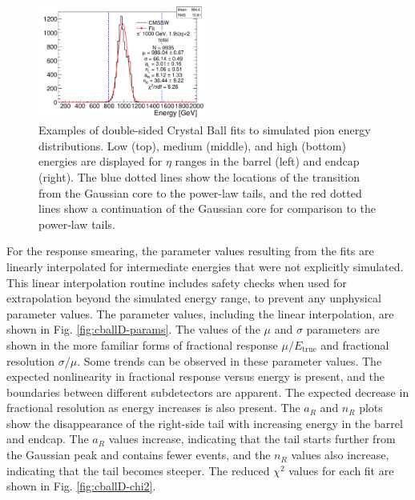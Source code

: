\begin{figure}[hbtp]
\begin{center}
\includegraphics[width=0.49\textwidth]{figures/pion_response_tot_cballD_1000gev_ieta20.pdf}
\caption{Examples of double-sided Crystal Ball fits to simulated pion energy distributions. Low (top), medium (middle), and high (bottom) energies are displayed for $\eta$ ranges in the barrel (left) and endcap (right). The blue dotted lines show the locations of the transition from the Gaussian core to the power-law tails, and the red dotted lines show a continuation of the Gaussian core for comparison to the power-law tails.}
\label{fig:cballD-fits}
\end{center}
\end{figure}

For the response smearing, the parameter values resulting from the fits are linearly interpolated for intermediate energies that were not explicitly simulated. This linear interpolation routine includes safety checks when used for extrapolation beyond the simulated energy range, to prevent any unphysical parameter values. The parameter values, including the linear interpolation, are shown in Fig. \ref{fig:cballD-params}. The values of the $\mu$ and $\sigma$ parameters are shown in the more familiar forms of fractional response $\mu/E_{\text{true}}$ and fractional resolution $\sigma/\mu$. Some trends can be observed in these parameter values. The expected nonlinearity in fractional response versus energy is present, and the boundaries between different subdetectors are apparent. The expected decrease in fractional resolution as energy increases is also present. The $a_{R}$ and $n_{R}$ plots show the disappearance of the right-side tail with increasing energy in the barrel and endcap. The $a_{R}$ values increase, indicating that the tail starts further from the Gaussian peak and contains fewer events, and the $n_{R}$ values also increase, indicating that the tail becomes steeper. The reduced $\chi^{2}$ values for each fit are shown in Fig. \ref{fig:cballD-chi2}.

